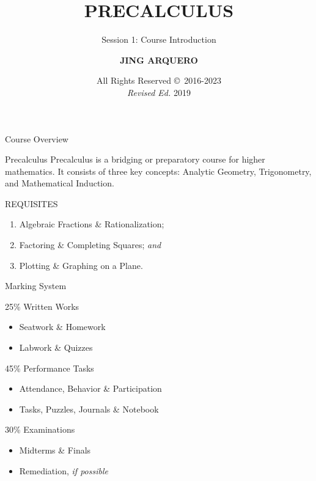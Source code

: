 \documentclass[12pt]{beamer}
\begin{document}
\title{\textbf{PRECALCULUS}}
\subtitle{Session 1: Course Introduction}
\author{\textbf{JING ARQUERO}}
\date{All Rights Reserved \copyright \, 2016-2023 \\ \textit{Revised Ed.} 2019}

\begin{frame}
  \maketitle
\end{frame}

\begin{frame}{Course Overview}
  \begin{block}{Precalculus}
  \justifying
    Precalculus is a bridging or preparatory course for higher mathematics. It consists of three key concepts: Analytic Geometry, Trigonometry, and Mathematical Induction.
  \end{block}
  REQUISITES
  \begin{enumerate}
   \item Algebraic Fractions \& Rationalization;
   \item Factoring \& Completing Squares; \textit{and}
   \item Plotting \& Graphing on a Plane.
  \end{enumerate}

\end{frame}

\begin{frame}{Marking System}
  \begin{block}{25\% Written Works}
   \begin{itemize}
    \item Seatwork \& Homework
    \item Labwork \& Quizzes
   \end{itemize}

  \end{block}

  \begin{block}{45\% Performance Tasks}
  \begin{itemize}
   \item Attendance, Behavior \& Participation
   \item Tasks, Puzzles, Journals \& Notebook
  \end{itemize}

  \end{block}

  \begin{block}{30\% Examinations}
   \begin{itemize}
    \item Midterms \& Finals
    \item Remediation, \textit{if possible}
   \end{itemize}

  \end{block}


\end{frame}
\end{document}
